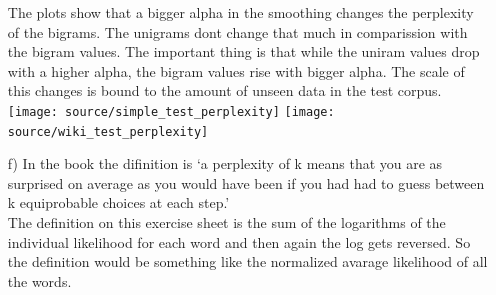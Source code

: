 \documentclass{article}
\begin{document}
\begin{itemize}
		The plots show that a bigger alpha in the smoothing changes the perplexity of the bigrams. The unigrams dont change that much in comparission with the bigram values. The important thing is that while the uniram values drop with a higher alpha, the bigram values rise with bigger alpha. The scale of this changes is bound to the amount of unseen data in the test corpus.
		\texttt{[image: source/simple\_test\_perplexity]}
		\texttt{[image: source/wiki\_test\_perplexity]}
		\item[f)] In the book the difinition is `a perplexity of k means that you are as surprised
on average as you would have been if you had had to guess between
k equiprobable choices at each step.'\\
The definition on this exercise sheet is the sum of the logarithms of the individual likelihood for each word and then again the log gets reversed. So the definition would be something like the normalized avarage likelihood of all the words.
\end{itemize}
\end{document}
